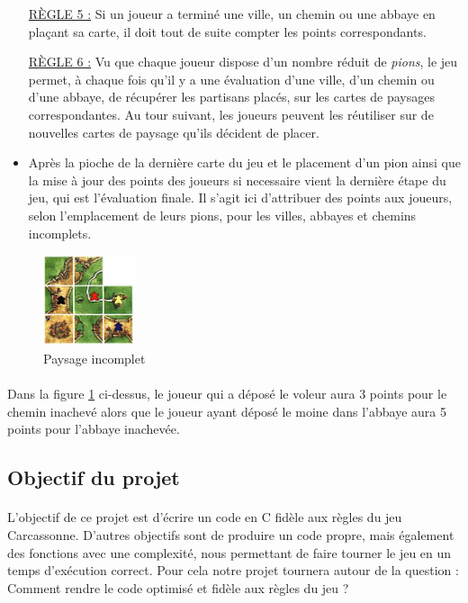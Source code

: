 \documentclass[12pt]{article}
\begin{document}
\begin{itemize}
\underline{RÈGLE 5 :} Si un joueur a terminé une ville, un chemin ou une abbaye en plaçant sa carte, il doit tout de suite compter les points correspondants. \newline

\underline{RÈGLE 6 :} Vu que chaque joueur dispose d'un nombre réduit de \textit{pions}, le jeu permet, à chaque fois qu'il y a une évaluation d'une ville, d'un chemin ou d'une abbaye, de récupérer les partisans placés, sur les cartes de paysages correspondantes. Au tour suivant, les joueurs peuvent les réutiliser sur de nouvelles cartes de paysage qu'ils décident de placer.\\

\item Après la pioche de la dernière carte du jeu et le placement d'un pion ainsi que la mise à jour des points des joueurs si necessaire vient la dernière étape du jeu, qui est l'évaluation finale. Il s'agit ici d'attribuer des points aux joueurs, selon l'emplacement de leurs pions, pour les villes, abbayes et chemins incomplets. 

\end{itemize}
\begin{figure}[h!]
\begin{center}
\includegraphics[width=0.24\textwidth]{eval-final.png}
\end{center} 
\caption{Paysage incomplet} \label{figure5}
\end{figure}

\paragraph{} Dans la figure \ref{figure5} ci-dessus, le joueur qui a déposé le voleur aura 3 points pour le chemin inachevé alors que le joueur ayant déposé le moine dans l'abbaye aura 5 points pour l'abbaye inachevée.

\subsection{Objectif du projet}

\paragraph{} L’objectif  de  ce  projet  est  d'écrire  un  code  en  C  fidèle  aux  règles  du  jeu Carcassonne. D’autres objectifs sont de produire un code propre, mais également des fonctions avec une complexité, nous permettant de faire tourner le jeu en un temps d’exécution correct. Pour cela notre projet tournera autour de la question : Comment rendre le code optimisé et fidèle aux règles du jeu ?
\end{document}
